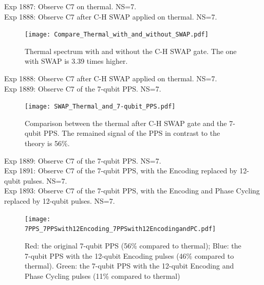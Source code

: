 \clearpage
Exp 1887: Observe C7 on thermal. NS=7.\\
Exp 1888: Observe C7 after C-H SWAP applied on thermal. NS=7.\\

\begin{figure}[htb]
\begin{center}
\texttt{[image: Compare\_Thermal\_with\_and\_without\_SWAP.pdf]}
\end{center}
\setlength{\abovecaptionskip}{-0.35cm}
\caption{\footnotesize{Thermal spectrum with and without the C-H SWAP gate. The one with SWAP is 3.39 times higher.}}\label{1887and1888}
\end{figure} 

\clearpage
Exp 1888: Observe C7 after C-H SWAP applied on thermal. NS=7.\\
Exp 1889: Observe C7 of the 7-qubit PPS. NS=7.\\

\begin{figure}[htb]
\begin{center}
\texttt{[image: SWAP\_Thermal\_and\_7-qubit\_PPS.pdf]}
\end{center}
\setlength{\abovecaptionskip}{-0.35cm}
\caption{\footnotesize{Comparison between the thermal after C-H SWAP gate and the 7-qubit PPS. The remained signal of the PPS in contrast to the theory is 56\%.}}\label{1888and1889}
\end{figure} 

\clearpage
Exp 1889: Observe C7 of the 7-qubit PPS. NS=7.\\
Exp 1891: Observe C7 of the 7-qubit PPS, with the Encoding replaced by 12-qubit pulses. NS=7.\\
Exp 1893: Observe C7 of the 7-qubit PPS, with the Encoding and Phase Cycling replaced by 12-qubit pulses. NS=7.\\

\begin{figure}[htb]
\begin{center}
\texttt{[image: 7PPS\_7PPSwith12Encoding\_7PPSwith12EncodingandPC.pdf]}
\end{center}
\setlength{\abovecaptionskip}{-0.35cm}
\caption{\footnotesize{Red: the original 7-qubit PPS (56\% compared to thermal); Blue: the 7-qubit PPS with the 12-qubit Encoding pulses (46\% compared to thermal). Green: the 7-qubit PPS with the 12-qubit Encoding and Phase Cycling pulses (11\% compared to thermal)}}\label{1889and1891and1893}
\end{figure} 